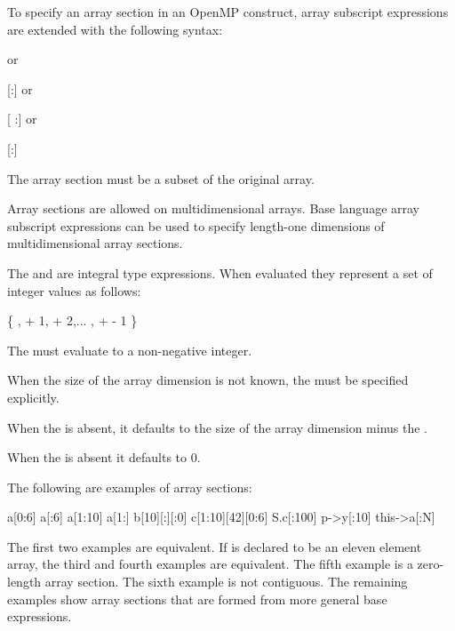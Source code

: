 \begin{ccppspecific}
To specify an array section in an OpenMP construct, array subscript expressions are
extended with the following syntax:
\begin{indentedcodelist}
 \textnormal{or}

[:\plc{ }] \textnormal{or}

[ :] \textnormal{or}

[\plc{ }:\plc{ }]
\end{indentedcodelist}

The array section must be a subset of the original array.


Array sections are allowed on multidimensional arrays. Base language array subscript
expressions can be used to specify length-one dimensions of multidimensional array
sections.

The  and  are integral type expressions. When evaluated they
represent a set of integer values as follows:

\{ ,  + 1,  + 2,... ,  +  - 1 \}

The  must evaluate to a non-negative integer.

When the size of the array dimension is not known, the  must be specified
explicitly.

When the  is absent, it defaults to the size of the array dimension minus the
.

When the  is absent it defaults to 0.


\begin{note}
The following are examples of array sections:

\begin{indentedcodelist}
a[0:6]
a[:6]
a[1:10]
a[1:]
b[10][:][:0]
c[1:10][42][0:6]
S.c[:100]
p->y[:10]
this->a[:N]
\end{indentedcodelist}

The first two examples are equivalent. If  is declared to be an eleven
element array, the third and fourth examples are equivalent. The fifth example
is a zero-length array section. The sixth example is not contiguous.  The
remaining examples show array sections that are formed from more general base
expressions.
\end{note}
\medskip
\end{ccppspecific}

